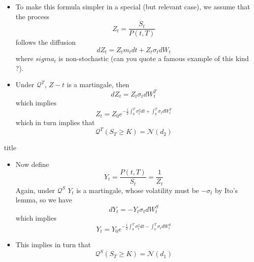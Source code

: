 \documentclass{beamer}
\begin{document}
\begin{frame}
	\begin{itemize}
		\item To make this formula simpler in a special (but relevant case), we assume that the process 
		\begin{equation}
			Z_t = \frac{S_t}{P(t,T)}
		\end{equation}
		follows the diffusion
		\begin{equation}
			dZ_t = Z_tm_tdt + Z_t\sigma_tdW_t
		\end{equation}
		where $sigma_t$ is non-stochastic (can you quote a famous example of this kind ?).
		\item Under $\mathcal{Q}^T$, $Z-t$ is a martingale, then
		\begin{equation}
			dZ_t = Z_t\sigma_tdW^T_t
		\end{equation}
		which implies
		\begin{equation}
			Z_t = Z_0 e^{-\frac{1}{2}\int_0^T\sigma_t^2 dt + \int_0^T\sigma_tdW^T_t}
		\end{equation}
		which in turn implies that
		\begin{equation}
			\mathcal{Q}^T(S_T\geq K) = \mathcal{N}(d_2)
		\end{equation}
	\end{itemize}
\end{frame}


\begin{frame}{title}
	\begin{itemize}
		\item Now define
		\begin{equation}
			Y_t = \frac{P(t,T)}{S_t}=\frac{1}{Z_t}
		\end{equation}
		Again, under $\mathcal{Q}^S$ $Y_t$ is a martingale, whose volatility must be $-\sigma_t$ by Ito's lemma, so we have
		\begin{equation}
			dY_t = -Y_t\sigma_tdW^S_t
		\end{equation} 
		which implies
		\begin{equation}
			Y_t = Y_0 e^{-\frac{1}{2}\int_0^T\sigma_t^2 dt - \int_0^T\sigma_tdW^S_t}
		\end{equation}
		\item This implies in turn that
		\begin{equation}
			\mathcal{Q}^S(S_T\geq K) = \mathcal{N}(d_1)
		\end{equation}
	\end{itemize}
\end{frame}
\end{document}
